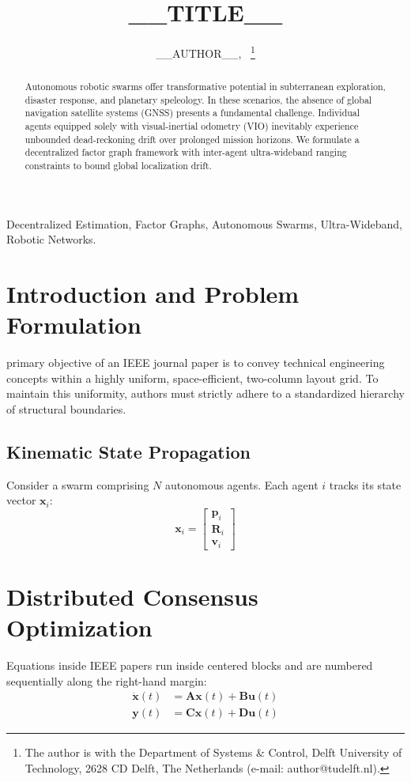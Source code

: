 \documentclass[10pt, journal]{IEEEtran}
\title{__TITLE__}
\author{__AUTHOR__,~\IEEEmembership{Member,~IEEE}%
\thanks{The author is with the Department of Systems \& Control, Delft University of Technology, 2628 CD Delft, The Netherlands (e-mail: author@tudelft.nl).}}
\begin{document}
\maketitle

\begin{abstract}
Autonomous robotic swarms offer transformative potential in subterranean exploration, disaster response, and planetary speleology. In these scenarios, the absence of global navigation satellite systems (GNSS) presents a fundamental challenge. Individual agents equipped solely with visual-inertial odometry (VIO) inevitably experience unbounded dead-reckoning drift over prolonged mission horizons. We formulate a decentralized factor graph framework with inter-agent ultra-wideband ranging constraints to bound global localization drift.
\end{abstract}

\begin{IEEEkeywords}
Decentralized Estimation, Factor Graphs, Autonomous Swarms, Ultra-Wideband, Robotic Networks.
\end{IEEEkeywords}

\section{Introduction and Problem Formulation}
 primary objective of an IEEE journal paper is to convey technical engineering concepts within a highly uniform, space-efficient, two-column layout grid. To maintain this uniformity, authors must strictly adhere to a standardized hierarchy of structural boundaries.

\subsection{Kinematic State Propagation}
Consider a swarm comprising $N$ autonomous agents. Each agent $i$ tracks its state vector $\mathbf{x}_i$:
\begin{equation}
	\mathbf{x}_i = \begin{bmatrix} \mathbf{p}_i \\ \mathbf{R}_i \\ \mathbf{v}_i \end{bmatrix}
\end{equation}

\section{Distributed Consensus Optimization}
Equations inside IEEE papers run inside centered blocks and are numbered sequentially along the right-hand margin:
\begin{align}
	\dot{\mathbf{x}}(t) &= \mathbf{A}\mathbf{x}(t) + \mathbf{B}\mathbf{u}(t) \label{eq:statespace} \\
	\mathbf{y}(t)       &= \mathbf{C}\mathbf{x}(t) + \mathbf{D}\mathbf{u}(t) \label{eq:output}
\end{align}
\end{document}
